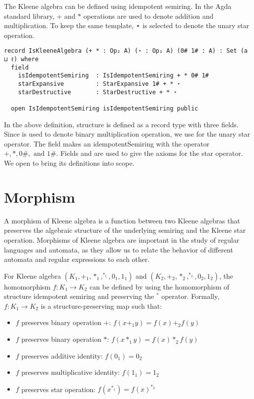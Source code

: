 The Kleene algebra can be defined using idempotent semiring. In the Agda
standard library, $+$ and $*$ operations are used to denote addition and
multiplication. To keep the same template, ⋆ is selected to denote the unary
star operation. 

\begin{verbatim}
record IsKleeneAlgebra (+ * : Op₂ A) (⋆ : Op₁ A) (0# 1# : A) : Set (a ⊔ ℓ) where
  field
    isIdempotentSemiring  : IsIdempotentSemiring + * 0# 1#
    starExpansive         : StarExpansive 1# + * ⋆
    starDestructive       : StarDestructive + * ⋆

  open IsIdempotentSemiring isIdempotentSemiring public
\end{verbatim}
In the above definition,  structure is defined as a
record type with three fields. Since \inline{*} is used to denote binary
multiplication operation, we use  for the unary star operator. The
field  makes an idempotentSemiring with the operator
$+,*,0\#, \text{ and } 1\#$. Fields  and
 are used to give the axioms for the star operator. We
open  to bring its definitions into scope.

\section{Morphism}
A morphism of Kleene algebra is a function between two Kleene algebras that
preserves the algebraic structure of the underlying semiring and the Kleene star
operation. Morphisms of Kleene algebra are important in the study of regular
languages and automata, as they allow us to relate the behavior of different
automata and regular expressions to each other.

For Kleene algebra $(K_1,+_1,*_1,^{*_1},0_1,1_1)$ and
$(K_2,+_2,*_2,^{*_2},0_2,1_2)$, the homomorphism $f: K_1 \rightarrow K_2$ can be
defined by using the homomorphism of structure idempotent semiring and
preserving the $^{*}$ operator. Formally, $f: K_1 \rightarrow K_2$ is a
structure-preserving map such that:
\begin{itemize}
\item $f$ preserves binary operation $+$: $f(x +_1 y) = f(x) +_2 f(y)$
\item $f$ preserves binary operation $*$: $f(x *_1 y) = f(x) *_2 f(y)$
\item $f$ preserves additive identity: $f(0_1) = 0_2$
\item $f$ preserves multiplicative identity: $f(1_1) = 1_2$
\item $f$ preserves star operation: $f(x^{*_1}) = f(x)^{*_2}$
\end{itemize}

